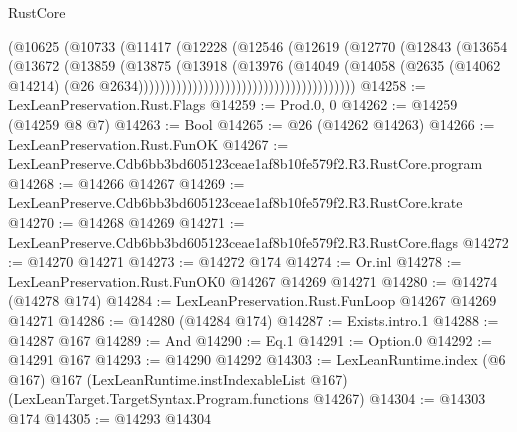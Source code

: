 \begin{lexlean}{RustCore}
\begin{coremodule}
                                                (@10625
                                                  (@10733
                                                    (@11417
                                                      (@12228
                                                        (@12546
                                                          (@12619
                                                            (@12770
                                                              (@12843
                                                                (@13654
                                                                  (@13672
                                                                    (@13859
                                                                      (@13875
                                                                        (@13918
                                                                          (@13976
                                                                            (@14049
                                                                              (@14058
                                                                                (@2635
                                                                                  (@14062 @14214)
                                                                                  (@26
                                                                                    @2634))))))))))))))))))))))))))))))))))))))))
@14258 := LexLeanPreservation.Rust.Flags
@14259 := Prod.{0, 0}
@14262 := @14259 (@14259 @8 @7)
@14263 := Bool
@14265 := @26 (@14262 @14263)
@14266 := LexLeanPreservation.Rust.FunOK
@14267 := LexLeanPreserve.Cdb6bb3bd605123ceae1af8b10fe579f2.R3.RustCore.program
@14268 := @14266 @14267
@14269 := LexLeanPreserve.Cdb6bb3bd605123ceae1af8b10fe579f2.R3.RustCore.krate
@14270 := @14268 @14269
@14271 := LexLeanPreserve.Cdb6bb3bd605123ceae1af8b10fe579f2.R3.RustCore.flags
@14272 := @14270 @14271
@14273 := @14272 @174
@14274 := Or.inl
@14278 := LexLeanPreservation.Rust.FunOK0 @14267 @14269 @14271
@14280 := @14274 (@14278 @174)
@14284 := LexLeanPreservation.Rust.FunLoop @14267 @14269 @14271
@14286 := @14280 (@14284 @174)
@14287 := Exists.intro.{1}
@14288 := @14287 @167
@14289 := And
@14290 := Eq.{1}
@14291 := Option.{0}
@14292 := @14291 @167
@14293 := @14290 @14292
@14303 := LexLeanRuntime.index
    (@6 @167)
    @167
    (LexLeanRuntime.instIndexableList @167)
    (LexLeanTarget.TargetSyntax.Program.functions @14267)
@14304 := @14303 @174
@14305 := @14293 @14304

\end{coremodule}
\end{lexlean}
